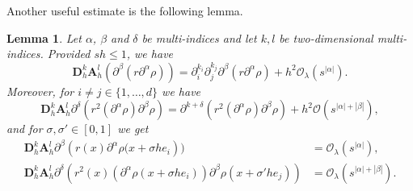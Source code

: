 \documentclass[11pt,oneside,leqno]{amsart}
\numberwithin{equation}{section}
\numberwithin{equation}{section}
\newtheorem{lemma}[theorem]{Lemma}
\begin{document}
Another useful estimate is the following lemma.
\begin{lemma}\label{lem:difference:average:2}
Let $\alpha$, $\beta$ and $\delta$ be multi-indices and let $k,l$ be two-dimensional multi-indices. Provided $sh\leq 1$, we have
\begin{equation}\label{lem:difference:average}
\mathbf{D}_{h}^{k}\mathbf{A}_{h}^{l}\left(\partial^{\beta}\left( r\partial^{\alpha}\rho\right) \right)=\partial_{i}^{k_{i}}\partial_{j}^{k_{j}}\partial^{\beta}\left(r\partial^{\alpha}\rho \right)+h^{2}\mathcal{O}_{\lambda}(s^{|\alpha|}).
\end{equation}
Moreover, for $i\neq j\in \{ 1,\ldots,d\}$ we have
\begin{equation}\label{eq0:lem:difference:average:3}
\mathbf{D}_{h}^{k}\mathbf{A}_{h}^{l}\partial^{\delta}\left(r^{2}\left(\partial^{\alpha}\rho\right)\partial^{\beta}\rho\right)=\partial^{k+\delta}\left(r^{2}(\partial^{\alpha}\rho)\partial^{\beta}\rho \right)+h^{2}\mathcal{O}(s^{|\alpha|+|\beta|}),
\end{equation}
and for $\sigma,\sigma'\in[0,1]$ we get
\begin{align}
\mathbf{D}^{k}_{h}\mathbf{A}_{h}^{l}\partial^{\beta}\left(r(x)\partial^{\alpha}\rho(x+\sigma he_{i
} \right))&=\mathcal{O}_{\lambda}(s^{|\alpha|}),\label{eq1:lem:difference:average}\\
\mathbf{D}_{h}^{k}\mathbf{A}_{h}^{l}\partial^{\delta}\left(r^{2}(x)\left( \partial^{\alpha}\rho(x+\sigma he_{i})\right)\partial^{\beta}\rho(x+\sigma' he_{j})\right)&=\mathcal{O}_{\lambda}(s^{|\alpha|+|\beta|}).\label{eq2:lem:difference:average}
\end{align}
\end{lemma}
\end{document}
